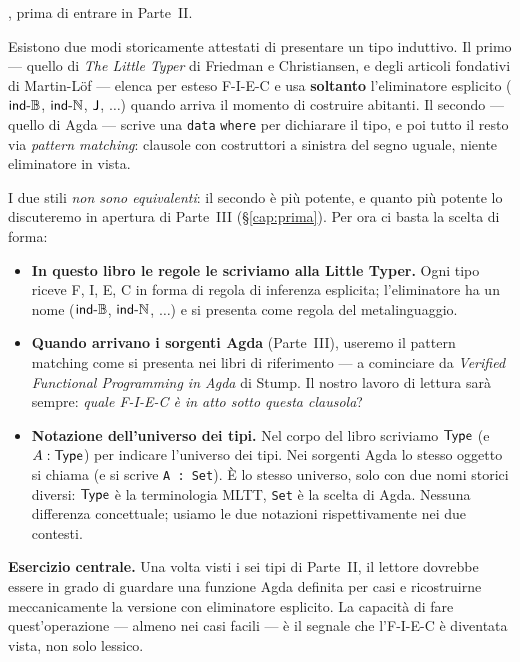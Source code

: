 , prima di entrare in Parte~II.

\bigskip

Esistono due modi storicamente attestati di presentare un tipo induttivo. Il primo --- quello di \emph{The Little Typer} di Friedman e Christiansen, e degli articoli fondativi di Martin-L\"of --- elenca per esteso F-I-E-C e usa \textbf{soltanto} l'eliminatore esplicito ($\mathsf{ind\text{-}\mathbb{B}}$, $\mathsf{ind\text{-}\mathbb{N}}$, $\mathsf{J}$, $\ldots$) quando arriva il momento di costruire abitanti. Il secondo --- quello di Agda --- scrive una \texttt{data} \texttt{where} per dichiarare il tipo, e poi tutto il resto via \emph{pattern matching}: clausole con costruttori a sinistra del segno uguale, niente eliminatore in vista.

I due stili \emph{non sono equivalenti}: il secondo \`e pi\`u potente, e quanto pi\`u potente lo discuteremo in apertura di Parte~III (\S\ref{cap:prima}). Per ora ci basta la scelta di forma:

\begin{itemize}
\item \textbf{In questo libro le regole le scriviamo alla Little Typer.} Ogni tipo riceve F, I, E, C in forma di regola di inferenza esplicita; l'eliminatore ha un nome ($\mathsf{ind\text{-}\mathbb{B}}$, $\mathsf{ind\text{-}\mathbb{N}}$, $\ldots$) e si presenta come regola del metalinguaggio.
\item \textbf{Quando arrivano i sorgenti Agda} (Parte~III), useremo il pattern matching come si presenta nei libri di riferimento --- a cominciare da \emph{Verified Functional Programming in Agda} di Stump. Il nostro lavoro di lettura sar\`a sempre: \emph{quale F-I-E-C \`e in atto sotto questa clausola}?
\item \textbf{Notazione dell'universo dei tipi.} Nel corpo del libro scriviamo $\mathsf{Type}$ (e $A : \mathsf{Type}$) per indicare l'universo dei tipi. Nei sorgenti Agda lo stesso oggetto si chiama  (e si scrive \texttt{A : Set}). \`E lo stesso universo, solo con due nomi storici diversi: $\mathsf{Type}$ \`e la terminologia MLTT, \texttt{Set} \`e la scelta di Agda. Nessuna differenza concettuale; usiamo le due notazioni rispettivamente nei due contesti.
\end{itemize}

\noindent\textbf{Esercizio centrale.} Una volta visti i sei tipi di Parte~II, il lettore dovrebbe essere in grado di guardare una funzione Agda definita per casi e ricostruirne meccanicamente la versione con eliminatore esplicito. La capacit\`a di fare quest'operazione --- almeno nei casi facili --- \`e il segnale che l'F-I-E-C \`e diventata vista, non solo lessico.
